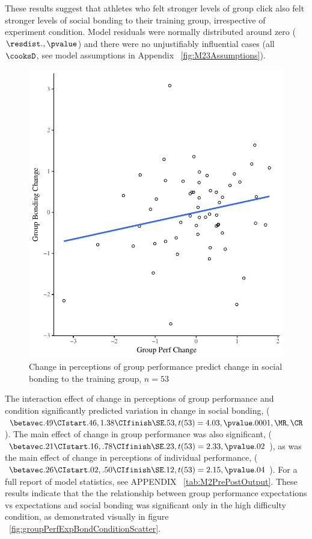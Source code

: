 These results suggest that athletes who felt stronger levels of group click also felt stronger levels of social bonding to their training group, irrespective of experiment condition.  Model residuals were normally distributed around zero ($\resdist ., \pvalue $) and there were no unjustifiably influential cases (all $\cooksD $, see model assumptions in Appendix ~\ref{fig:M23Assumptions}).






\begin{figure}
  \centering
  \includegraphics[width=0.5\linewidth,keepaspectratio] {images/groupPerfBondingChangeCondition}
  \caption{Change in perceptions of group performance predict change in social bonding to the training group, $n = 53$}
 \label{fig:groupPerfBondingChangeCondition}
\end{figure}

The interaction effect of change in perceptions of group performance and condition significantly predicted variation in change in social bonding, ($\betavec .49 \CIstart .46, 1.38 \CIfinish \SE .53, t(53) = 4.03, \pvalue .0001, \MR , \CR $). The main effect of change in group performance was also significant, ($\betavec .21 \CIstart .16, .78 \CIfinish \SE.23, t(53) = 2.33, \pvalue .02$), as was the main effect of change in perceptions of individual performance, ($\betavec .26 \CIstart .02, .50 \CIfinish \SE.12, t(53) = 2.15, \pvalue .04$).
For a full report of model statistics, see APPENDIX ~\ref{tab:M2PrePostOutput}.  These results indicate that the the relationship between group performance expectations vs expectations and social bonding was significant only in the high difficulty condition, as demonstrated visually in figure ~\ref{fig:groupPerfExpBondConditionScatter}.

